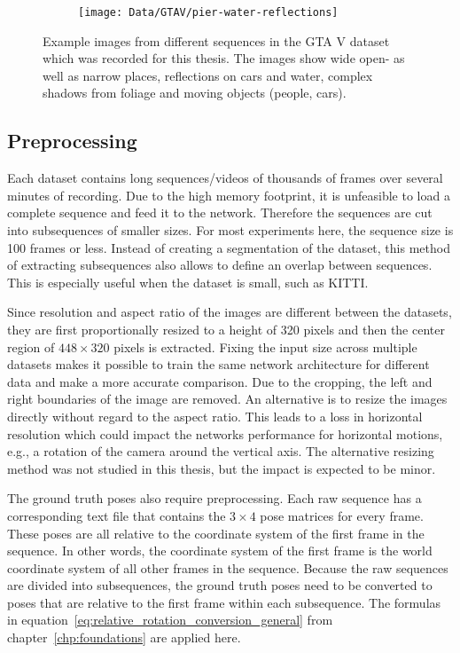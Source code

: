 \begin{figure}
\begin{subfigure}[b]{0.33\linewidth}
				\end{subfigure}\hfill%
				\begin{subfigure}[b]{0.33\linewidth}
					\centering
					\texttt{[image: Data/GTAV/pier-water-reflections]}
				\end{subfigure}%
				\caption[Example images from the GTA V dataset]
						{Example images from different sequences in the GTA V dataset which was recorded for this thesis.
						 The images show wide open- as well as narrow places, reflections on cars and water, complex shadows from foliage and moving objects (people, cars).
						 \label{fig:example-images-GTAV}}
			\end{figure}
			
			
		\subsection{Preprocessing}\label{sec:preprocessing}
			Each dataset contains long sequences/videos of thousands of frames over several minutes of recording.
			Due to the high memory footprint, it is unfeasible to load a complete sequence and feed it to the network.
			Therefore the sequences are cut into subsequences of smaller sizes. 
			For most experiments here, the sequence size is 100 frames or less.
			Instead of creating a segmentation of the dataset, this method of extracting subsequences also allows to define an overlap between sequences.
			This is especially useful when the dataset is small, such as KITTI.
			
			Since resolution and aspect ratio of the images are different between the datasets, they are first proportionally resized to a height of 320 pixels and then the center region of $448 \times 320$ pixels is extracted.
			Fixing the input size across multiple datasets makes it possible to train the same network architecture for different data and make a more accurate comparison.
			Due to the cropping, the left and right boundaries of the image are removed.
			An alternative is to resize the images directly without regard to the aspect ratio.
			This leads to a loss in horizontal resolution which could impact the networks performance for horizontal motions, e.g., a rotation of the camera around the vertical axis.
			The alternative resizing method was not studied in this thesis, but the impact is expected to be minor.
			
			The ground truth poses also require preprocessing. 
			Each raw sequence has a corresponding text file that contains the $3 \times 4$ pose matrices for every frame.
			These poses are all relative to the coordinate system of the first frame in the sequence.
			In other words, the coordinate system of the first frame is the world coordinate system of all other frames in the sequence.
			Because the raw sequences are divided into subsequences, the ground truth poses need to be converted to poses that are relative to the first frame within each subsequence.
			The formulas in equation~\ref{eq:relative_rotation_conversion_general} from chapter~\ref{chp:foundations} are applied here.
			
